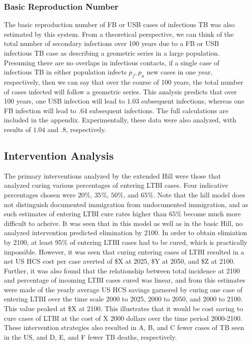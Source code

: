\documentclass{amsart}
\begin{document}
\subsubsection{Basic Reproduction Number}
The basic reproduction number of FB or USB cases of infectious TB was also
estimated by this system. From a theoretical perspective, we can think of the
total number of secondary infections over 100 years due to a FB or USB
infectious TB case as describing a geometric series in a large population.
Presuming there are no overlaps in infectious contacts, if a single case of
infectious TB in either population infects $p_f, p_u$ new cases in one year,
respectively, then we can say that over the course of 100 years, the total
number of cases infected will follow a geometric series. This analysis predicts
that over 100 years, one USB infection will lead to $1.03$ subsequent infections,
whereas one FB infection will lead to $.64$ subsequent infections. The full calculations
are included in the appendix.  Experimentally, these data were also analyzed, 
with results of $1.04$ and $.8$, respectively. 

\subsection{Intervention Analysis}
The primary interventions analyzed by the extended Hill were those that analyzed
curing various percentages of entering LTBI cases. Four indicative percentages
chosen were $20\%$, $35\%$, $50\%$, and $65\%$. Note that the hill model does
not distinguish documented immigration from undocumented immigration, and as
such estimates of entering LTBI cure rates higher than $65\%$ become much more
difficult to acheive. It was seen that in this model as well as in the basic
Hill, no analyzed intervention predicted elimination by 2100. In order to obtain
elimiation by 2100, at least 95\% of entering LTBI cases had to be cured, which
is practically impossible. However, it was seen that curing entering cases of
LTBI resulted in a net US HCS cost per case averted of \$X at 2025, \$Y at 2050,
and \$Z at 2100. Further, it was also found that the relationship between total
incidence at 2100 and percentage of incoming LTBI cases cured was linear, and
from this estimates were made of the yearly average US HCS savings garnered by
curing one case of entering LTBI over the time scale 2000 to 2025, 2000 to 2050,
and 2000 to 2100. This value peaked at \$X at 2100. This illustrates that it
would be cost saving to cure cases of LTBI at the cost of X 2000 dollars over
the time period 2000-2100. These intervention strategies also resulted in A, B,
and C fewer cases of TB seen in the US, and D, E, and F fewer TB
deaths, respectively. 
\end{document}
